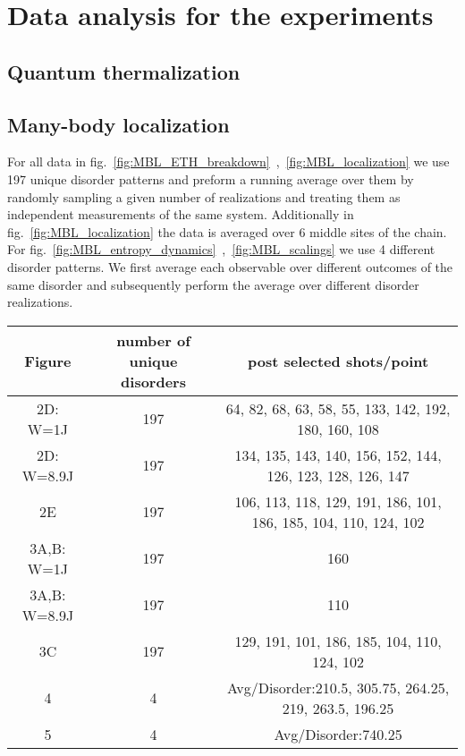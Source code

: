 \chapter{Data analysis for the experiments}
\label{AppendixB}

\section{Quantum thermalization}


\section{Many-body localization}
For all data in fig.~\ref{fig:MBL_ETH_breakdown}~,~\ref{fig:MBL_localization} we use 197 unique disorder patterns and preform a running average over them by randomly sampling a given number of realizations and treating them as independent measurements of the same system. Additionally in fig.~\ref{fig:MBL_localization} the data is averaged over 6 middle sites of the chain. For fig.~\ref{fig:MBL_entropy_dynamics}~,~\ref{fig:MBL_scalings} we use 4 different disorder patterns. We first average each observable over different outcomes of the same disorder and subsequently perform the average over different disorder realizations. 

\begin{center}
	\begin{tabular}{|c|c|c|}
		\hline Figure & number of unique disorders & post selected shots/point\\
		\hline 2D: W=1J & 197 & 64, 82, 68, 63, 58, 55, 133, 142, 192, 180, 160, 108\\ 
		\hline 2D: W=8.9J & 197 & 134, 135, 143, 140, 156, 152, 144, 126, 123, 128, 126, 147 \\ 
		\hline 2E & 197 & 106, 113, 118, 129, 191, 186, 101, 186, 185, 104, 110, 124, 102 \\ 
		\hline 3A,B: W=1J & 197 & 160\\ 
		\hline 3A,B: W=8.9J & 197 & 110 \\ 
		\hline 3C & 197 & 129, 191, 101, 186, 185, 104, 110, 124, 102 \\ 
		\hline 4 & 4 & Avg/Disorder:210.5, 305.75, 264.25, 219, 263.5, 196.25\\
		\hline 5 & 4 & Avg/Disorder:740.25\\
		\hline
	\end{tabular} 
\end{center}